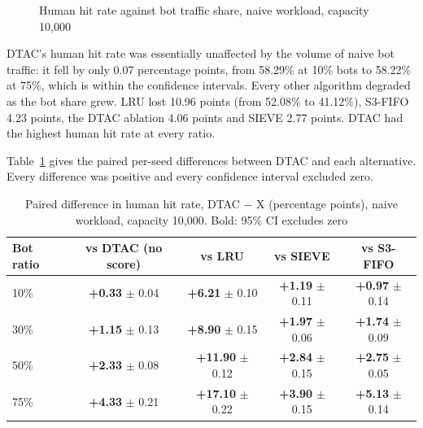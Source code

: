 \begin{figure}[htbp]
    \centering
    \caption{Human hit rate against bot traffic share, naive workload, capacity 10{,}000}
    \label{fig:hhr-naive}
\end{figure}

DTAC's human hit rate was essentially unaffected by the volume of naive bot traffic: it fell by only 0.07 percentage points, from 58.29\% at 10\% bots to 58.22\% at 75\%, which is within the confidence intervals. Every other algorithm degraded as the bot share grew. LRU lost 10.96 points (from 52.08\% to 41.12\%), S3-FIFO 4.23 points, the DTAC ablation 4.06 points and SIEVE 2.77 points. DTAC had the highest human hit rate at every ratio.

Table~\ref{tab:paired-naive} gives the paired per-seed differences between DTAC and each alternative. Every difference was positive and every confidence interval excluded zero.

\begin{table}[htbp]
    \centering
    \caption{Paired difference in human hit rate, DTAC $-$ X (percentage points), naive workload, capacity 10{,}000. Bold: 95\% CI excludes zero}
    \label{tab:paired-naive}
    \small
    \begin{tabular}{lcccc}
        \toprule
        Bot ratio & vs DTAC (no score) & vs LRU & vs SIEVE & vs S3-FIFO \\
        \midrule
        10\% & \textbf{+0.33} $\pm$ 0.04 & \textbf{+6.21} $\pm$ 0.10 & \textbf{+1.19} $\pm$ 0.11 & \textbf{+0.97} $\pm$ 0.14 \\
        30\% & \textbf{+1.15} $\pm$ 0.13 & \textbf{+8.90} $\pm$ 0.15 & \textbf{+1.97} $\pm$ 0.06 & \textbf{+1.74} $\pm$ 0.09 \\
        50\% & \textbf{+2.33} $\pm$ 0.08 & \textbf{+11.90} $\pm$ 0.12 & \textbf{+2.84} $\pm$ 0.15 & \textbf{+2.75} $\pm$ 0.05 \\
        75\% & \textbf{+4.33} $\pm$ 0.21 & \textbf{+17.10} $\pm$ 0.22 & \textbf{+3.90} $\pm$ 0.15 & \textbf{+5.13} $\pm$ 0.14 \\
        \bottomrule
    \end{tabular}
\end{table}


